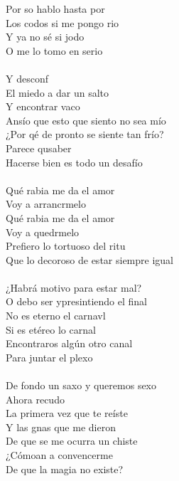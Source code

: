 \begin{cancion}[Arrancármelo][Wos]
	Por so hablo hasta por\\
	Los codos si me pongo rio\\
Y ya no sé si jodo\\
O me lo tomo en serio\\
\jump\\
	Y desconf\\
El miedo a dar un salto\\
	Y encontrar vaco\\
Ansío que esto que siento no sea mío\\
	¿Por qé de pronto se siente tan frío?\\
	Parece qusaber\\
Hacerse bien es todo un desafío\\
\jump\\
	 Qué rabia me da el amor\\
	Voy a arrancrmelo\\
Qué rabia me da el amor\\
	Voy a quedrmelo \\
	Prefiero lo tortuoso del ritu\\
Que lo decoroso de estar siempre igual\\
\jump\\
	 ¿Habrá motivo para estar mal?\\
	O debo ser ypresintiendo el final\\
	No es eterno el carnavl\\
Si es etéreo lo carnal\\
	Encontraros algún otro canal\\
Para juntar el plexo\\
\jump\\
	 De fondo un saxo y queremos sexo\\
	Ahora recudo\\
La primera vez que te reíste\\
	Y las gnas que me dieron\\
De que se me ocurra un chiste\\
	¿Cómoan a convencerme\\
De que la magia no existe?\\\jump\\
	\begin{chorus}%

\end{chorus}
\end{cancion}

